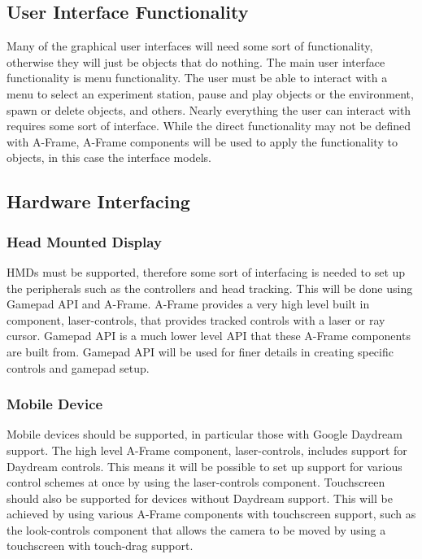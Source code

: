 \documentclass[onecolumn, draftclsnofoot,10pt, compsoc]{IEEEtran}
\begin{document}
\subsection{User Interface Functionality}
Many of the graphical user interfaces will need some sort of functionality, otherwise they will just be objects that do nothing. The main user interface functionality is menu functionality. The user must be able to interact with a menu to select an experiment station, pause and play objects or the environment, spawn or delete objects, and others. Nearly everything the user can interact with requires some sort of interface. While the direct functionality may not be defined with A-Frame, A-Frame components will be used to apply the functionality to objects, in this case the interface models. 

\subsection{Hardware Interfacing}
\subsubsection{Head Mounted Display}
HMDs must be supported, therefore some sort of interfacing is needed to set up the peripherals such as the controllers and head tracking. This will be done using Gamepad API and A-Frame. A-Frame provides a very high level built in component, laser-controls, that provides tracked controls with a laser or ray cursor. Gamepad API is a much lower level API that these A-Frame components are built from. Gamepad API will be used for finer details in creating specific controls and gamepad setup.

\subsubsection{Mobile Device}
Mobile devices should be supported, in particular those with Google Daydream support. The high level A-Frame component, laser-controls, includes support for Daydream controls. This means it will be possible to set up support for various control schemes at once by using the laser-controls component. Touchscreen should also be supported for devices without Daydream support. This will be achieved by using various A-Frame components with touchscreen support, such as the look-controls component that allows the camera to be moved by using a touchscreen with touch-drag support.
\end{document}
